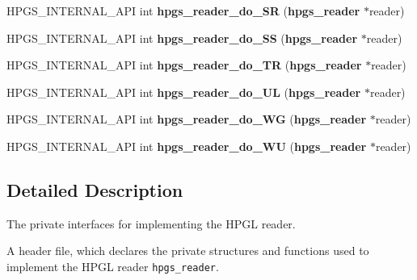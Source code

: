 \begin{CompactItemize}
\item 
HPGS\_\-INTERNAL\_\-API int \textbf{hpgs\_\-reader\_\-do\_\-SR} ({\bf hpgs\_\-reader} $\ast$reader)\label{group__reader_g4a24948f7c51bcd66eef03287ee32817}

\item 
HPGS\_\-INTERNAL\_\-API int \textbf{hpgs\_\-reader\_\-do\_\-SS} ({\bf hpgs\_\-reader} $\ast$reader)\label{group__reader_gf1ec4288bbddaab160fbbd62087657ea}

\item 
HPGS\_\-INTERNAL\_\-API int \textbf{hpgs\_\-reader\_\-do\_\-TR} ({\bf hpgs\_\-reader} $\ast$reader)\label{group__reader_g1d1fef69731ae8b75b6e8888dc3d4e09}

\item 
HPGS\_\-INTERNAL\_\-API int \textbf{hpgs\_\-reader\_\-do\_\-UL} ({\bf hpgs\_\-reader} $\ast$reader)\label{group__reader_g9d7b05da59f6c4ffe747bfeba933f753}

\item 
HPGS\_\-INTERNAL\_\-API int \textbf{hpgs\_\-reader\_\-do\_\-WG} ({\bf hpgs\_\-reader} $\ast$reader)\label{group__reader_g5c79a4c2eeda221339afbd0b4d1e3007}

\item 
HPGS\_\-INTERNAL\_\-API int \textbf{hpgs\_\-reader\_\-do\_\-WU} ({\bf hpgs\_\-reader} $\ast$reader)\label{group__reader_g53cfcda314a1990582befe9a02ec2038}

\end{CompactItemize}


\subsection{Detailed Description}
The private interfaces for implementing the HPGL reader. 

A header file, which declares the private structures and functions used to implement the HPGL reader {\tt hpgs\_\-reader}. 